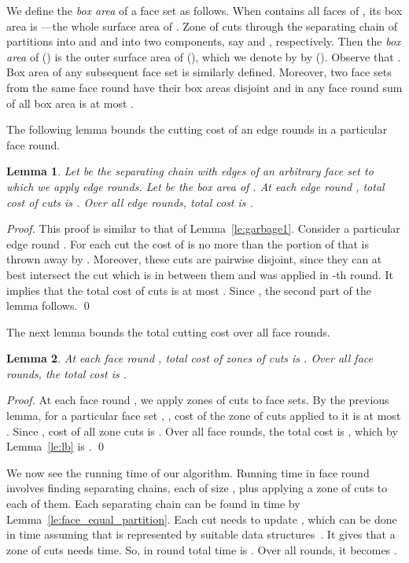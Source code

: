 \documentclass{llncs}
\newtheorem{lem}{Lemma}
\begin{document}
We define the \emph{box area} of a face set  as follows.
When  contains all faces of , its box area is ---the whole surface area of .
Zone of cuts through the separating chain of  partitions  into  and 
and  into two components, say  and , respectively.
Then the \emph{box area} of  () is the outer surface area of  (),
which we denote by by  ().
Observe that .
Box area of any subsequent face set is similarly defined.
Moreover, two face sets from the same face round have their box areas disjoint
and in any face round sum of all box area is at most .


The following lemma bounds the cutting cost of an edge rounds in a particular face round.

\begin{lem}
Let  be the separating chain with  edges of an arbitrary face set  
to which we apply  edge rounds.
Let  be the box area of .
At each edge round , total cost of  cuts is .
Over all  edge rounds, total cost is .
\end{lem}


\begin{proof}
This proof is similar to that of Lemma~\ref{le:garbage1}.
Consider a particular edge round .
For each cut  the cost of  is no more than the portion of  that is thrown away by .
Moreover, these cuts are pairwise disjoint, 
since they can at best intersect the cut which is in between them and was applied in -th round.
It implies that the total cost of  cuts is at most .
Since , the second part of the lemma follows.
\qed
\end{proof}

The next lemma bounds the total cutting cost over all face rounds.

\begin{lem}
At each face round , total cost of  zones of cuts is .
Over all  face rounds, the total cost is .
\end{lem}

\begin{proof}
At each face round , we apply  zones of cuts to  face sets.
By the previous lemma, for a particular face set , ,
cost of the zone of cuts applied to it is at most .
Since , cost of all zone cuts is 
.
Over all  face rounds, the total cost is ,
which  by Lemma~\ref{le:lb} is . 
\qed
\end{proof}


We now see the running time of our algorithm.
Running time in face round  involves finding  separating chains,
each of size  , 
plus applying a zone of cuts to each of them. 
Each separating chain 
can be found in  time by Lemma~\ref{le:face_equal_partition}.
Each cut needs to update , which can be done in  time assuming that  is 
represented by suitable data structures~\cite{berg}.
It gives that a zone of cuts needs  time.
So, in round  total time is .
Over all  rounds, it becomes .
\end{document}
